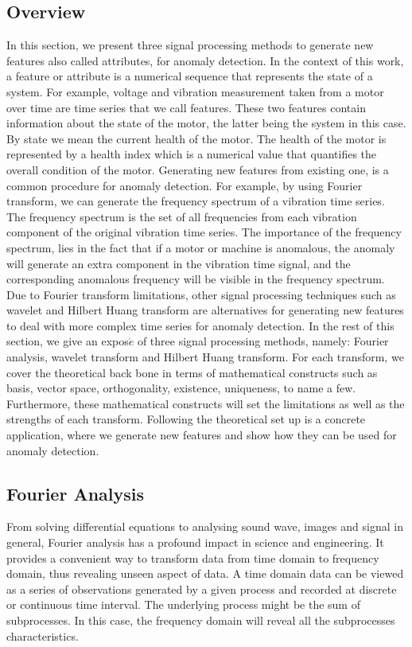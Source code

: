 \documentclass[11pt, oneside]{article}   	%
\begin{document}
\subsection{Overview}
 In this section, we present three signal processing methods to generate new features also called attributes, for anomaly detection. In the context of this work, a feature or attribute is a numerical sequence that represents the state of a system. For example, voltage and vibration measurement taken from a motor over time are time series that we call features. These two features contain information about the state of the motor, the latter being the system in this case. 
 By state we mean the current health of the motor. The health of the motor is represented by a health index which is a numerical value that quantifies the overall condition of the motor.
 \justify
 Generating new features from existing one, is a common procedure for anomaly detection. For example, by using Fourier transform, we can generate the frequency spectrum of a vibration time series. The frequency spectrum is the set of all frequencies from each vibration component of the original vibration time series. The importance of the frequency spectrum, lies in the fact that if a motor or machine is anomalous, the anomaly will generate an extra component in the vibration time signal, and the corresponding anomalous frequency will be visible in the frequency spectrum. Due to Fourier transform limitations, other signal processing techniques such as
  wavelet and Hilbert Huang transform are alternatives for generating new features to deal with more complex time series for anomaly detection.
 \justify
 In the rest of this section, we give an expos$\acute{e}$  of three signal processing methods, namely: Fourier analysis, wavelet transform and Hilbert Huang transform. For each transform, we cover the theoretical back bone in terms of mathematical constructs such as basis, vector space, orthogonality, existence, uniqueness, to name a few. Furthermore, these mathematical constructs will set the limitations as well as the strengths of each transform. Following the theoretical set up is a concrete application, where we generate new features and show how they can be used for anomaly detection.
 


\subsection{Fourier Analysis}
From solving differential equations to analysing sound wave, images and signal in general, Fourier analysis has a profound impact in science and engineering. It provides a convenient way to transform data from time domain to frequency domain, thus revealing unseen aspect of data. A time domain data can be viewed as a series of observations generated by a given process and recorded at discrete or continuous time interval. The underlying process might be the sum of subprocesses. In this case, the frequency domain will reveal all the subprocesses characteristics.
\end{document}
